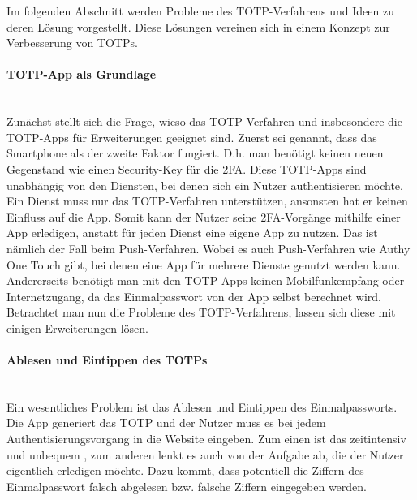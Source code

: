 Im folgenden Abschnitt werden Probleme des TOTP-Verfahrens und Ideen zu deren 
Lösung vorgestellt. Diese Lösungen vereinen sich in einem Konzept zur 
Verbesserung von TOTPs.

\paragraph*{TOTP-App als Grundlage}
\mbox{} \vspace{0.1cm} \\
Zunächst stellt sich die Frage, wieso das TOTP-Verfahren und insbesondere die 
TOTP-Apps für Erweiterungen geeignet sind. Zuerst sei genannt, dass das 
Smartphone als der zweite Faktor fungiert. D.h. man benötigt keinen neuen 
Gegenstand wie einen Security-Key für die 2FA. Diese TOTP-Apps sind unabhängig 
von den Diensten, bei denen sich ein Nutzer authentisieren möchte. Ein Dienst muss nur das TOTP-Verfahren unterstützen, ansonsten hat er 
keinen Einfluss auf die App. Somit kann der Nutzer seine 2FA-Vorgänge mithilfe 
einer App erledigen, anstatt für jeden Dienst eine eigene App zu nutzen. Das ist 
nämlich der Fall beim Push-Verfahren. Wobei es auch Push-Verfahren wie Authy One 
Touch gibt, bei denen eine App für mehrere Dienste genutzt werden kann. 
Andererseits benötigt man mit den TOTP-Apps keinen Mobilfunkempfang oder 
Internetzugang, da das Einmalpasswort von der App selbst berechnet wird.  
Betrachtet man nun die Probleme des 
TOTP-Verfahrens, lassen sich diese mit einigen Erweiterungen lösen.

\paragraph*{Ablesen und Eintippen des TOTPs}
\mbox{} \vspace{0.1cm} \\
Ein wesentliches Problem ist das Ablesen und Eintippen des 
Einmalpassworts. Die App generiert das TOTP und der Nutzer muss es bei jedem 
Authentisierungsvorgang in die Website eingeben. Zum einen ist das 
zeitintensiv und unbequem \autocite{Reese}, zum anderen lenkt es auch von der Aufgabe ab, die der 
Nutzer eigentlich erledigen möchte. Dazu kommt, dass potentiell die Ziffern des 
Einmalpasswort falsch abgelesen bzw. falsche Ziffern eingegeben werden.

